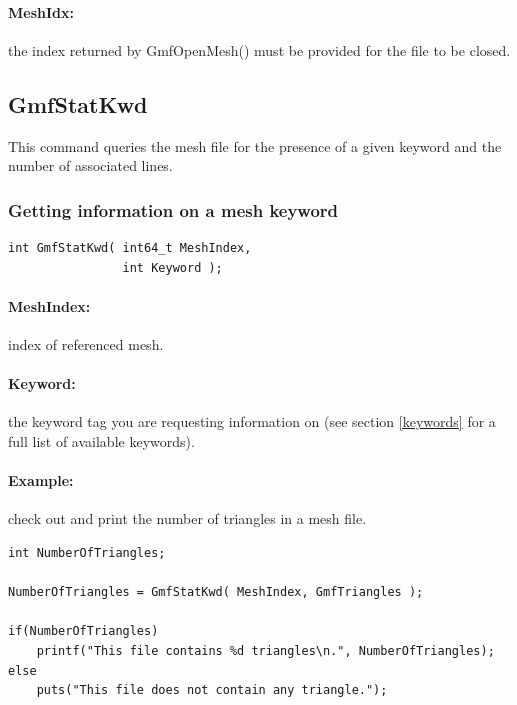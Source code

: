 \documentclass[a4paper,12pt]{article}
\begin{document}
\paragraph{MeshIdx:}
the index returned by GmfOpenMesh() must be provided for the file to be closed.


\subsection{GmfStatKwd}
This command queries the mesh file for the presence of a given keyword and the number of associated lines.


\subsubsection{Getting information on a mesh keyword}

\begin{tt}
\begin{verbatim}
int GmfStatKwd( int64_t MeshIndex,
                int Keyword );
\end{verbatim}
\end{tt}
\normalfont

\paragraph{MeshIndex:} index of referenced mesh.

\paragraph{Keyword:} the keyword tag you are requesting information on (see section \ref{keywords} for a full list of available keywords).

\paragraph{Example:} check out and print the number of triangles in a mesh file.

\begin{tt}
\begin{verbatim}
int NumberOfTriangles;

NumberOfTriangles = GmfStatKwd( MeshIndex, GmfTriangles );

if(NumberOfTriangles)
    printf("This file contains %d triangles\n.", NumberOfTriangles);
else
    puts("This file does not contain any triangle.");
\end{verbatim}
\end{tt}
\normalfont
\end{document}
